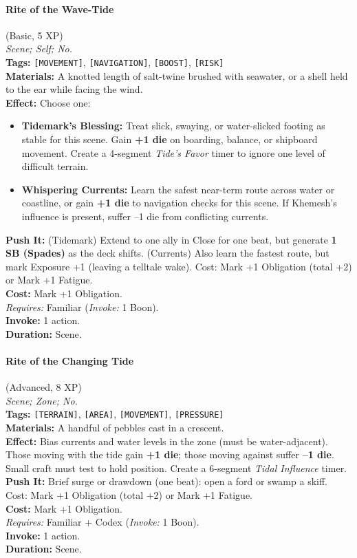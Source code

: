 \paragraph{Rite of the Wave-Tide} (Basic, 5 XP) \hfill \\
\emph{Scene; Self; No.} \\
\textbf{Tags:} \texttt{[MOVEMENT]}, \texttt{[NAVIGATION]}, \texttt{[BOOST]}, \texttt{[RISK]} \\
\textbf{Materials:} A knotted length of salt-twine brushed with seawater, or a shell held to the ear while facing the wind. \\
\textbf{Effect:} Choose one:
\begin{itemize}
  \item \textbf{Tidemark's Blessing:} Treat slick, swaying, or water-slicked footing as stable for this scene. Gain \textbf{+1 die} on boarding, balance, or shipboard movement. Create a 4-segment \textit{Tide's Favor} timer to ignore one level of difficult terrain.
  \item \textbf{Whispering Currents:} Learn the safest near-term route across water or coastline, or gain \textbf{+1 die} to navigation checks for this scene. If Khemesh's influence is present, suffer --1 die from conflicting currents.
\end{itemize}
\textbf{Push It:} (Tidemark) Extend to one ally in Close for one beat, but generate \textbf{1 SB (Spades)} as the deck shifts. (Currents) Also learn the fastest route, but mark Exposure +1 (leaving a telltale wake). Cost: Mark +1 Obligation (total +2) or Mark +1 Fatigue. \\
\textbf{Cost:} Mark +1 Obligation. \\
\textit{Requires:} Familiar (\textit{Invoke:} 1 Boon). \\
\textbf{Invoke:} 1 action. \\
\textbf{Duration:} Scene.

\paragraph{Rite of the Changing Tide} (Advanced, 8 XP) \hfill \\
\emph{Scene; Zone; No.} \\
\textbf{Tags:} \texttt{[TERRAIN]}, \texttt{[AREA]}, \texttt{[MOVEMENT]}, \texttt{[PRESSURE]} \\
\textbf{Materials:} A handful of pebbles cast in a crescent. \\
\textbf{Effect:} Bias currents and water levels in the zone (must be water-adjacent). Those moving with the tide gain \textbf{+1 die}; those moving against suffer \textbf{--1 die}. Small craft must test to hold position. Create a 6-segment \textit{Tidal Influence} timer. \\
\textbf{Push It:} Brief surge or drawdown (one beat): open a ford or swamp a skiff. Cost: Mark +1 Obligation (total +2) or Mark +1 Fatigue. \\
\textbf{Cost:} Mark +1 Obligation. \\
\textit{Requires:} Familiar + Codex (\textit{Invoke:} 1 Boon). \\
\textbf{Invoke:} 1 action. \\
\textbf{Duration:} Scene.


